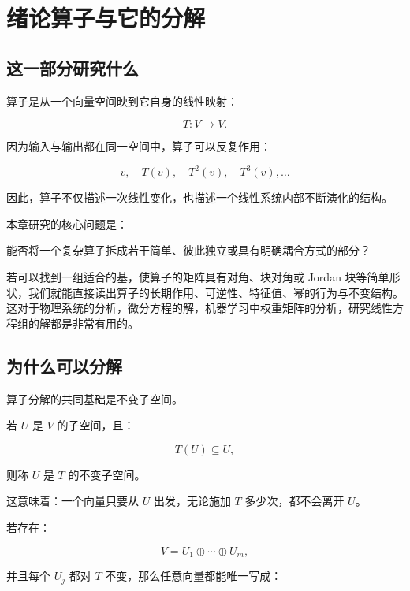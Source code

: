 
\chapter*{绪论\quad 算子与它的分解}


\section*{这一部分研究什么}

算子是从一个向量空间映到它自身的线性映射：

\[
T:V\to V.
\]

因为输入与输出都在同一空间中，算子可以反复作用：

\[
v,\quad T(v),\quad T^2(v),\quad T^3(v),\ldots
\]

因此，算子不仅描述一次线性变化，也描述一个线性系统内部不断演化的结构。

本章研究的核心问题是：

\begin{jinsight}
能否将一个复杂算子拆成若干简单、彼此独立或具有明确耦合方式的部分？
\end{jinsight}

若可以找到一组适合的基，使算子的矩阵具有对角、块对角或 Jordan 块等简单形状，我们就能直接读出算子的长期作用、可逆性、特征值、幂的行为与不变结构。这对于物理系统的分析，微分方程的解，机器学习中权重矩阵的分析，研究线性方程组的解都是非常有用的。

\section*{为什么可以分解}

算子分解的共同基础是不变子空间。

若 $U$ 是 $V$ 的子空间，且：

\[
T(U)\subseteq U,
\]

则称 $U$ 是 $T$ 的不变子空间。

这意味着：一个向量只要从 $U$ 出发，无论施加 $T$ 多少次，都不会离开 $U$。

若存在：

\[
V=U_1\oplus\cdots\oplus U_m,
\]

并且每个 $U_j$ 都对 $T$ 不变，那么任意向量都能唯一写成：

